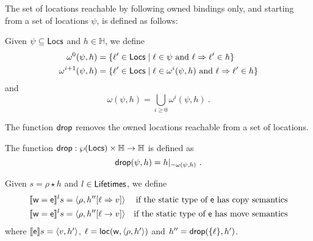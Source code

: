 The set of locations reachable by following owned bindings only, and starting from a set of locations $\psi$,
is defined as follows:
%
\begin{definition}
  Given $\psi\subseteq\Locs$ and $h\in\mathbb{H}$, we define
  \begin{align*}
  \omega^0(\psi,h)&=\{\ell'\in\Locs\mid\ell\in\psi\text{ and }\ell\Rightarrow\ell'\in h\}\\
  \omega^{i+1}(\psi,h)&=\{\ell'\in\Locs\mid\ell\in\omega^i(\psi,h)\text{ and }\ell\Rightarrow\ell'\in h\}
  \end{align*}
  and
  \[
  \omega(\psi,h)=\bigcup\limits_{i\ge 0}\omega^i(\psi,h)~.
  \]
\end{definition}

The function $\drop$ removes the owned locations reachable from a set of locations.
%
\begin{definition}[Drop]\label{def:drop}
  The function $\drop:\wp(\Locs)\times\mathbb{H}\to\mathbb{H}$ is defined as
  \[
  \drop(\psi,h)=h|_{-{\omega(\psi,h)}}~.
  \]
\end{definition}

\begin{definition}\label{def:semantics_assigmment}
  Given $s=\rho\star h$ and $l\in\Lifetimes$, we define
  \begin{align*}
    \denl[\mathsf{w}=\mathsf{e}]{l}{s}&=\langle\rho,h''[\ell\Rightarrow v]\rangle & \text{if the static type of $\mathsf{e}$ has copy semantics}\\
    \denl[\mathsf{w}=\mathsf{e}]{l}{s}&=\langle\rho,h''[\ell\to v]\rangle & \text{if the static type of $\mathsf{e}$ has move semantics}
  \end{align*}
  where $\den[\mathsf{e}]{s}=\langle v,h'\rangle$, $\ell=\loc(\mathsf{w},\langle\rho,h'\rangle)$ and
  $h''=\drop(\{\ell\},h')$.
\end{definition}
